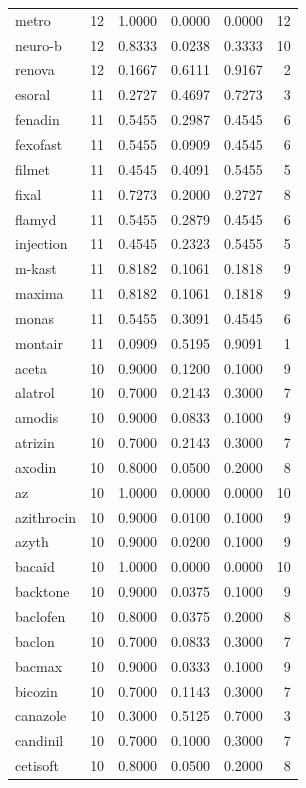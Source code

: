 \begin{longtable}{p{3.0cm}rrrrr}
metro & 12 & 1.0000 & 0.0000 & 0.0000 & 12 \\
neuro-b & 12 & 0.8333 & 0.0238 & 0.3333 & 10 \\
renova & 12 & 0.1667 & 0.6111 & 0.9167 & 2 \\
esoral & 11 & 0.2727 & 0.4697 & 0.7273 & 3 \\
fenadin & 11 & 0.5455 & 0.2987 & 0.4545 & 6 \\
fexofast & 11 & 0.5455 & 0.0909 & 0.4545 & 6 \\
filmet & 11 & 0.4545 & 0.4091 & 0.5455 & 5 \\
fixal & 11 & 0.7273 & 0.2000 & 0.2727 & 8 \\
flamyd & 11 & 0.5455 & 0.2879 & 0.4545 & 6 \\
injection & 11 & 0.4545 & 0.2323 & 0.5455 & 5 \\
m-kast & 11 & 0.8182 & 0.1061 & 0.1818 & 9 \\
maxima & 11 & 0.8182 & 0.1061 & 0.1818 & 9 \\
monas & 11 & 0.5455 & 0.3091 & 0.4545 & 6 \\
montair & 11 & 0.0909 & 0.5195 & 0.9091 & 1 \\
aceta & 10 & 0.9000 & 0.1200 & 0.1000 & 9 \\
alatrol & 10 & 0.7000 & 0.2143 & 0.3000 & 7 \\
amodis & 10 & 0.9000 & 0.0833 & 0.1000 & 9 \\
atrizin & 10 & 0.7000 & 0.2143 & 0.3000 & 7 \\
axodin & 10 & 0.8000 & 0.0500 & 0.2000 & 8 \\
az & 10 & 1.0000 & 0.0000 & 0.0000 & 10 \\
azithrocin & 10 & 0.9000 & 0.0100 & 0.1000 & 9 \\
azyth & 10 & 0.9000 & 0.0200 & 0.1000 & 9 \\
bacaid & 10 & 1.0000 & 0.0000 & 0.0000 & 10 \\
backtone & 10 & 0.9000 & 0.0375 & 0.1000 & 9 \\
baclofen & 10 & 0.8000 & 0.0375 & 0.2000 & 8 \\
baclon & 10 & 0.7000 & 0.0833 & 0.3000 & 7 \\
bacmax & 10 & 0.9000 & 0.0333 & 0.1000 & 9 \\
bicozin & 10 & 0.7000 & 0.1143 & 0.3000 & 7 \\
canazole & 10 & 0.3000 & 0.5125 & 0.7000 & 3 \\
candinil & 10 & 0.7000 & 0.1000 & 0.3000 & 7 \\
cetisoft & 10 & 0.8000 & 0.0500 & 0.2000 & 8 \\

\end{longtable}
